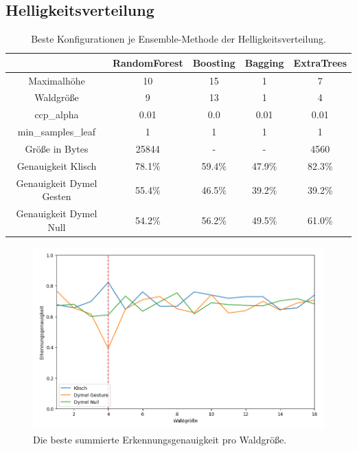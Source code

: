 \subsection{Helligkeitsverteilung}
\begin{table}[h!]
    \centering
    \begin{tabular}{ | c | c | c | c | c |}
        \hline
        & RandomForest & Boosting & Bagging & ExtraTrees \\\hline
        Maximalhöhe & 10 & 15 & 1 & 7 \\\hline
        Waldgröße & 9 & 13 & 1 & 4 \\\hline
        ccp\_alpha & 0.01 & 0.0 & 0.01 & 0.01 \\\hline
        min\_samples\_leaf & 1 & 1 & 1 & 1 \\\hline
        Größe in Bytes & 25844 & - & - & 4560 \\\hline
        Genauigkeit Klisch & 78.1\% & 59.4\% & 47.9\% & 82.3\% \\\hline
        Genauigkeit Dymel Gesten & 55.4\% & 46.5\% & 39.2\% & 39.2\% \\\hline
        Genauigkeit Dymel Null & 54.2\% & 56.2\% & 49.5\% & 61.0\% \\\hline
    \end{tabular}
    \label{tab:helligkeitsverteilung}
    \caption{Beste Konfigurationen je Ensemble-Methode der Helligkeitsverteilung.}
\end{table}
\begin{figure}[h!]
    \centering
    \includegraphics[width=\linewidth]{images/helligkeitsverteilung_acc_per_size.png}
    \caption{Die beste summierte Erkennungsgenauigkeit pro Waldgröße.}
    \label{fig:helligkeitsverteilung_per_forest_size}
\end{figure}
